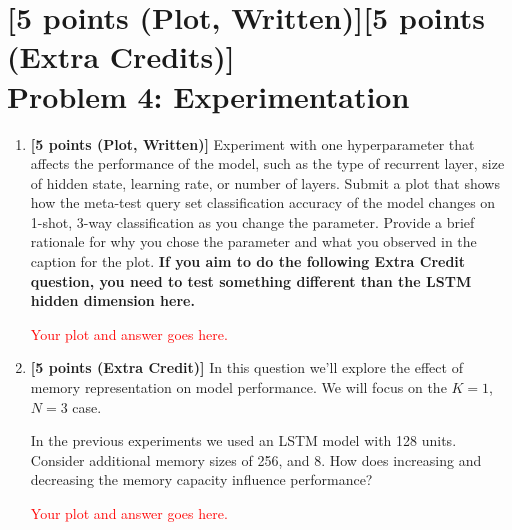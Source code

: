 \documentclass[12pt]{article}
\begin{document}
\section*{\textbf{[5 points (Plot, Written)][5 points (Extra Credits)]}\\
Problem 4: Experimentation}
\begin{enumerate}[label=\alph*]
    \item \textbf{[5 points (Plot, Written)]} Experiment with one hyperparameter that affects the performance of the model, such as the type of recurrent layer, size of hidden state, learning rate, or number of layers.  Submit a plot that shows how the meta-test query set classification accuracy of the model changes on 1-shot, 3-way classification as you change the parameter. Provide a brief rationale for why you chose the parameter and what you observed in the caption for the plot. \textbf{If you aim to do the following Extra Credit question, you need to test something different than the LSTM hidden dimension here.}

    
    \textcolor{red}{Your plot and answer goes here.}
    
    
    \item \textbf{[5 points (Extra Credit)]} In this question we'll explore the effect of memory representation on model performance. We will focus on the $K=1$, $N=3$ case.
    
    In the previous experiments we used an LSTM model with 128 units. Consider additional memory sizes of 256, and 8. How does increasing and decreasing the memory capacity influence performance?
    
    \textcolor{red}{Your plot and answer goes here.}
    
\end{enumerate}

\newpage


\end{document}
